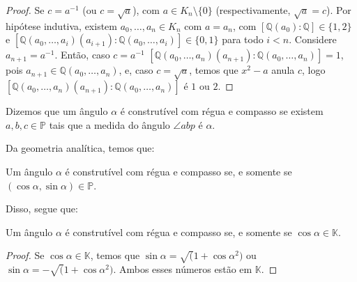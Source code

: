 \begin{proof}
    Se $c=a^{-1}$ (ou $c=\sqrt a$), com $a\in K_n\setminus\{0\}$ (respectivamente, $\sqrt a=c$). Por hipótese indutiva, existem $a_0, \dots, a_n\in K_n$ com $a=a_n$, com $[\mathbb Q(a_0): \mathbb Q]\in \{1, 2\}$ e $[\mathbb Q(a_0, \dots, a_i)(a_{i+1}):\mathbb Q(a_0, \dots, a_i)]\in \{0, 1\}$ para todo $i<n$. Considere $a_{n+1}=a^{-1}$. Então, caso $c=a^{-1}$ $[\mathbb Q(a_0, \dots, a_n)(a_{n+1}):\mathbb Q(a_0, \dots, a_n)]=1$, pois $a_{n+1}\in \mathbb Q(a_0, \dots, a_n)$, e, caso $c=\sqrt a$, temos que $x^2-a$ anula $c$, logo $[\mathbb Q(a_0, \dots, a_n)(a_{n+1}):\mathbb Q(a_0, \dots, a_n)]$ é $1$ ou $2$.
\end{proof}

\begin{definition}
Dizemos que um ângulo $\alpha$ é construtível com régua e compasso se existem $a, b, c \in \mathbb P$ tais que a medida do ângulo $\angle{abp}$ é $\alpha$.
\end{definition}

Da geometria analítica, temos que:
\begin{prop}
    Um ângulo $\alpha$ é construtível com régua e compasso se, e somente se $(\cos \alpha, \sin \alpha) \in \mathbb P$.
\end{prop}
Disso, segue que:
\begin{prop}
    Um ângulo $\alpha$ é construtível com régua e compasso se, e somente se $\cos \alpha \in \mathbb K$.
\end{prop}
\begin{proof}
Se $\cos \alpha \in \mathbb K$, temos que $\sin \alpha=\sqrt(1+\cos \alpha^2)$ ou $\sin \alpha=-\sqrt(1+\cos \alpha^2)$. Ambos esses números estão em $\mathbb K$.
\end{proof}

